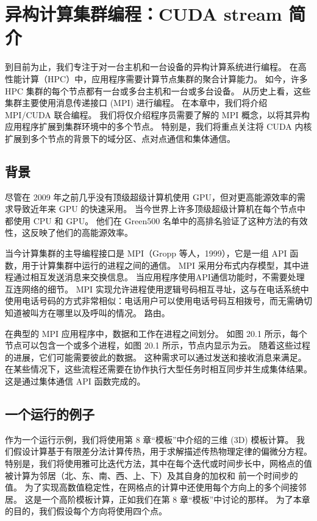 \section{异构计算集群编程：CUDA stream 简介}
到目前为止，我们专注于对一台主机和一台设备的异构计算系统进行编程。 在高性能计算（HPC）中，应用程序需要计算节点集群的聚合计算能力。 如今，许多 HPC 集群的每个节点都有一台或多台主机和一台或多台设备。 从历史上看，这些集群主要使用消息传递接口 (MPI) 进行编程。 在本章中，我们将介绍 MPI/CUDA 联合编程。 我们将仅介绍程序员需要了解的 MPI 概念，以将其异构应用程序扩展到集群环境中的多个节点。 特别是，我们将重点关注将 CUDA 内核扩展到多个节点的背景下的域分区、点对点通信和集体通信。

\subsection{背景}
尽管在 2009 年之前几乎没有顶级超级计算机使用 GPU，但对更高能源效率的需求导致近年来 GPU 的快速采用。 当今世界上许多顶级超级计算机在每个节点中都使用 CPU 和 GPU。 他们在 Green500 名单中的高排名验证了这种方法的有效性，这反映了他们的高能源效率。

当今计算集群的主导编程接口是 MPI（Gropp 等人，1999），它是一组 API 函数，用于计算集群中运行的进程之间的通信。 MPI 采用分布式内存模型，其中进程通过相互发送消息来交换信息。 当应用程序使用API通信功能时，不需要处理互连网络的细节。 MPI 实现允许进程使用逻辑号码相互寻址，这与在电话系统中使用电话号码的方式非常相似：电话用户可以使用电话号码互相拨号，而无需确切知道被叫方在哪里以及呼叫的情况。 路由。

在典型的 MPI 应用程序中，数据和工作在进程之间划分。 如图 20.1 所示，每个节点可以包含一个或多个进程，如图 20.1 所示，节点内显示为云。 随着这些过程的进展，它们可能需要彼此的数据。 这种需求可以通过发送和接收消息来满足。 在某些情况下，这些流程还需要在协作执行大型任务时相互同步并生成集体结果。 这是通过集体通信 API 函数完成的。

\subsection{一个运行的例子}
作为一个运行示例，我们将使用第 8 章“模板”中介绍的三维 (3D) 模板计算。 我们假设计算基于有限差分法计算传热，用于求解描述传热物理定律的偏微分方程。 特别是，我们将使用雅可比迭代方法，其中在每个迭代或时间步长中，网格点的值被计算为邻居（北、东、南、西、上、下）及其自身的加权和 前一个时间步的值。 为了实现高数值稳定性，在网格点的计算中还使用每个方向上的多个间接邻居。 这是一个高阶模板计算，正如我们在第 8 章“模板”中讨论的那样。 为了本章的目的，我们假设每个方向将使用四个点。

